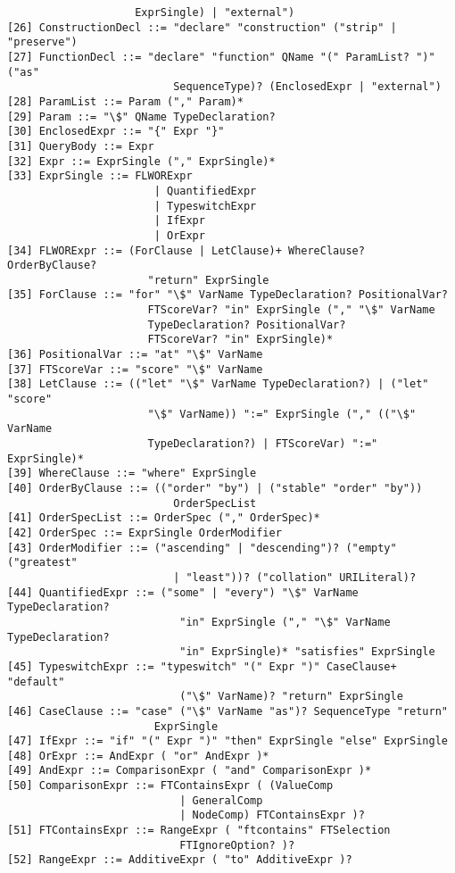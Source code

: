 \begin{verbatim}
                    ExprSingle) | "external")
[26] ConstructionDecl ::= "declare" "construction" ("strip" | "preserve")
[27] FunctionDecl ::= "declare" "function" QName "(" ParamList? ")" ("as"
                          SequenceType)? (EnclosedExpr | "external")
[28] ParamList ::= Param ("," Param)*
[29] Param ::= "\$" QName TypeDeclaration?
[30] EnclosedExpr ::= "{" Expr "}"
[31] QueryBody ::= Expr
[32] Expr ::= ExprSingle ("," ExprSingle)*
[33] ExprSingle ::= FLWORExpr
                       | QuantifiedExpr
                       | TypeswitchExpr
                       | IfExpr
                       | OrExpr
[34] FLWORExpr ::= (ForClause | LetClause)+ WhereClause? OrderByClause?
                      "return" ExprSingle
[35] ForClause ::= "for" "\$" VarName TypeDeclaration? PositionalVar?
                      FTScoreVar? "in" ExprSingle ("," "\$" VarName
                      TypeDeclaration? PositionalVar?
                      FTScoreVar? "in" ExprSingle)* 
[36] PositionalVar ::= "at" "\$" VarName
[37] FTScoreVar ::= "score" "\$" VarName
[38] LetClause ::= (("let" "\$" VarName TypeDeclaration?) | ("let" "score"
                      "\$" VarName)) ":=" ExprSingle ("," (("\$" VarName
                      TypeDeclaration?) | FTScoreVar) ":=" ExprSingle)*
[39] WhereClause ::= "where" ExprSingle
[40] OrderByClause ::= (("order" "by") | ("stable" "order" "by"))
                          OrderSpecList 
[41] OrderSpecList ::= OrderSpec ("," OrderSpec)*
[42] OrderSpec ::= ExprSingle OrderModifier
[43] OrderModifier ::= ("ascending" | "descending")? ("empty" ("greatest"
                          | "least"))? ("collation" URILiteral)?
[44] QuantifiedExpr ::= ("some" | "every") "\$" VarName TypeDeclaration?
                           "in" ExprSingle ("," "\$" VarName TypeDeclaration?
                           "in" ExprSingle)* "satisfies" ExprSingle
[45] TypeswitchExpr ::= "typeswitch" "(" Expr ")" CaseClause+ "default"
                           ("\$" VarName)? "return" ExprSingle
[46] CaseClause ::= "case" ("\$" VarName "as")? SequenceType "return"
                       ExprSingle
[47] IfExpr ::= "if" "(" Expr ")" "then" ExprSingle "else" ExprSingle
[48] OrExpr ::= AndExpr ( "or" AndExpr )*
[49] AndExpr ::= ComparisonExpr ( "and" ComparisonExpr )*
[50] ComparisonExpr ::= FTContainsExpr ( (ValueComp
                           | GeneralComp
                           | NodeComp) FTContainsExpr )?
[51] FTContainsExpr ::= RangeExpr ( "ftcontains" FTSelection
                           FTIgnoreOption? )?
[52] RangeExpr ::= AdditiveExpr ( "to" AdditiveExpr )?

\end{verbatim}
